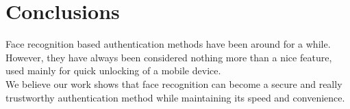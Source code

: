\section{Conclusions}
    Face recognition based authentication methods have been around for a while. However,
    they have always been considered nothing more than a nice feature, used mainly for
    quick unlocking of a mobile device.\\
    We believe our work shows that face recognition can
    become a secure and really trustworthy authentication method while maintaining
    its speed and convenience.
    
